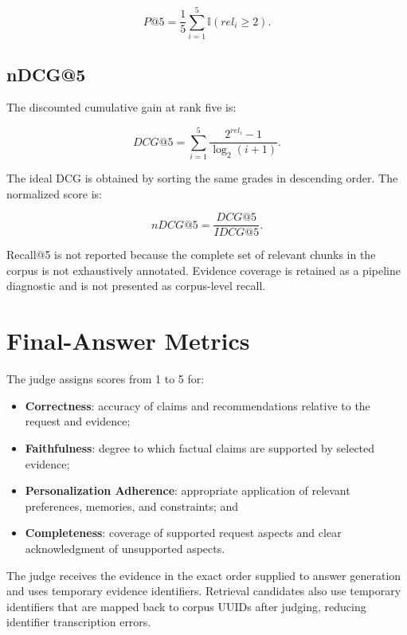 \begin{equation}
P@5=\frac{1}{5}\sum_{i=1}^{5}\mathbb{I}(rel_i\geq2).
\end{equation}

\subsection{nDCG@5}

The discounted cumulative gain at rank five is:

\begin{equation}
DCG@5=\sum_{i=1}^{5}\frac{2^{rel_i}-1}{\log_2(i+1)}.
\end{equation}

The ideal DCG is obtained by sorting the same grades in descending order. The
normalized score is:

\begin{equation}
nDCG@5=\frac{DCG@5}{IDCG@5}.
\end{equation}

Recall@5 is not reported because the complete set of relevant chunks in the
corpus is not exhaustively annotated. Evidence coverage is retained as a
pipeline diagnostic and is not presented as corpus-level recall.

\section{Final-Answer Metrics}

The judge assigns scores from 1 to 5 for:

\begin{itemize}
    \item \textbf{Correctness}: accuracy of claims and recommendations relative
    to the request and evidence;
    \item \textbf{Faithfulness}: degree to which factual claims are supported
    by selected evidence;
    \item \textbf{Personalization Adherence}: appropriate application of
    relevant preferences, memories, and constraints; and
    \item \textbf{Completeness}: coverage of supported request aspects and clear
    acknowledgment of unsupported aspects.
\end{itemize}

The judge receives the evidence in the exact order supplied to answer
generation and uses temporary evidence identifiers. Retrieval candidates also
use temporary identifiers that are mapped back to corpus UUIDs after judging,
reducing identifier transcription errors.

